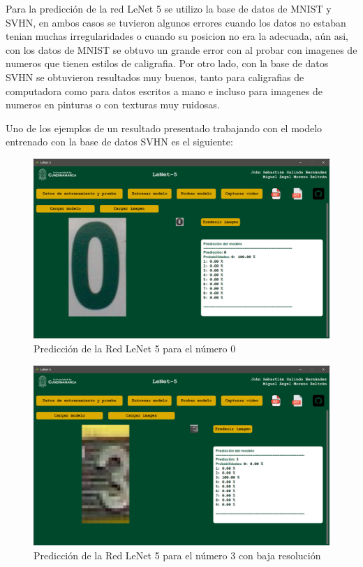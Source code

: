 Para la predicción de la red LeNet 5 se utilizo la base de datos de MNIST y SVHN, en ambos casos se tuvieron
algunos errores cuando los datos no estaban tenian muchas irregularidades o cuando su posicion no era la adecuada,
aún asi, con los datos de MNIST se obtuvo un grande error con al probar con imagenes de numeros que tienen estilos 
de caligrafia. Por otro lado, con la base de datos SVHN se obtuvieron resultados muy buenos, tanto para caligrafias
de computadora como para datos escritos a mano e incluso para imagenes de numeros en pinturas o con texturas muy
ruidosas.

Uno de los ejemplos de un resultado presentado trabajando con el modelo entrenado con la base de datos SVHN es el
siguiente:

\begin{figure}[htbp]
    \centering
    \includegraphics[width=\linewidth]{src/figures/pic_test_image_0.png}
    \caption{Predicción de la Red LeNet 5 para el número 0}
    \label{fig:Prediction_pic_0}
\end{figure}

\begin{figure}[htbp]
    \centering
    \includegraphics[width=1.05\linewidth]{src/figures/pic_test_image_3.png}
    \caption{Predicción de la Red LeNet 5 para el número 3 con baja resolución}
    \label{fig:Prediction_pic_1}
\end{figure}

